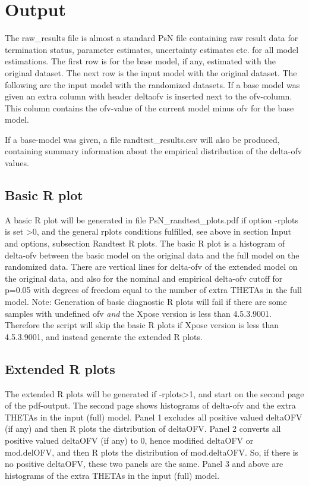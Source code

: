 \section{Output}
The raw\_results file is almost a standard PsN file containing raw result data for termination status, parameter estimates, uncertainty estimates etc. for all model estimations. The first row is for the base model, if any, estimated with the original dataset. The next row is the input model with the original dataset. The following are the input model with the randomized datasets. If a base model was given an extra column with header deltaofv is inserted next to the ofv-column. This column contains the ofv-value of the current model minus ofv for the base model.

If a base-model was given, a file randtest\_results.csv will also be produced, containing summary information about the empirical distribution of the delta-ofv values.

\subsection{Basic R plot}
A basic R plot will be generated in file PsN\_randtest\_plots.pdf if option -rplots is set >0,
and the general rplots conditions fulfilled, see above in section Input and options, subsection Randtest R plots.
The basic R plot is a histogram of delta-ofv between the basic model on the original data and the full model on the randomized data. There are vertical lines for delta-ofv of the extended model on the original data, and also for the nominal and empirical delta-ofv cutoff for p=0.05 with degrees of freedom equal to the number of extra THETAs in the full model.
Note: Generation of basic diagnostic R plots will fail if there are some samples with undefined ofv \emph{and} the Xpose version is less than 4.5.3.9001.
Therefore the script will skip the basic R plots if Xpose version is less than 4.5.3.9001, and instead generate the extended R plots.

\subsection{Extended R plots}
The extended R plots will be generated if -rplots>1, and start on the second page of the pdf-output. The second page shows
histograms of delta-ofv and the extra THETAs in the input (full) model. Panel 1 excludes all positive valued deltaOFV (if any) and then R plots the distribution of deltaOFV. Panel 2 converts all positive valued deltaOFV (if any) to 0, hence modified deltaOFV or mod.delOFV, and then R plots the distribution of mod.deltaOFV. So, if there is no positive deltaOFV, these two panels are the same. Panel 3 and above are histograms of the extra THETAs in the input (full) model.

